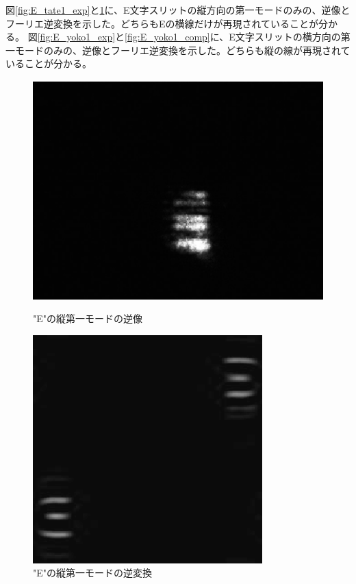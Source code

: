 \documentclass[11pt,a4]{jarticle}
\begin{document}
図\ref{fig:E_tate1_exp}と\ref{fig:E_tate1_comp}に、E文字スリットの縦方向の第一モードのみの、逆像とフーリエ逆変換を示した。どちらもEの横線だけが再現されていることが分かる。
図\ref{fig:E_yoko1_exp}と\ref{fig:E_yoko1_comp}に、E文字スリットの横方向の第一モードのみの、逆像とフーリエ逆変換を示した。どちらも縦の線が再現されていることが分かる。
\begin{figure}[htbp]
 \begin{minipage}{0.55\hsize}
   \begin{center}
    \includegraphics[width=0.9\hsize]{./E_tate1_exp.eps}
    \caption{"E"の縦第一モードの逆像}
     \label{fig:E_tate1_exp}
   \end{center}
 \end{minipage}
 \begin{minipage}{0.45\hsize}
   \begin{center}
    \includegraphics[width=0.9\hsize]{./E_tate1_comp.eps}
    \caption{"E"の縦第一モードの逆変換}
     \label{fig:E_tate1_comp}
   \end{center}
 \end{minipage}
\end{figure}
\end{document}
